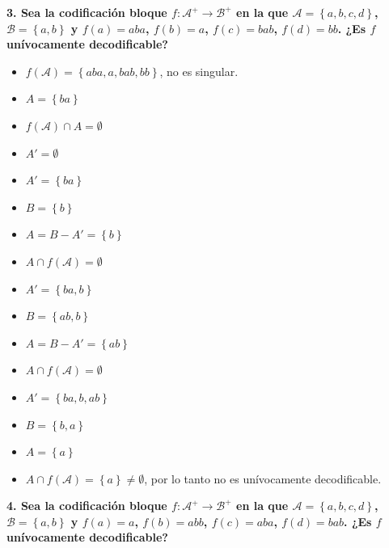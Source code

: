 \documentclass{article}
\begin{document}
\vspace{1cm}

\textbf{
3. Sea la codificación bloque $f:\mathcal{A}^+\rightarrow\mathcal{B}^+$ en la que $\mathcal{A}=\left\{a,b,c,d\right\}$, $\mathcal{B}=\left\{a,b\right\}$ y $f(a)=aba$, $f(b) = a$, $f(c)=bab$, $f(d)=bb$. ¿Es $f$ unívocamente decodificable?
}

\vspace{0.5cm}

\begin{itemize}
    \item $f\left(\mathcal{A}\right)=\left\{aba,a,bab,bb\right\}$, no es singular.
    \item $A = \left\{ba\right\}$
    \item $f\left(\mathcal{A}\right)\cap A = \emptyset$
    \item $A'=\emptyset$
    \item $A'=\left\{ba\right\}$
    \item $B = \left\{b\right\}$
    \item $A = B-A' = \left\{b\right\}$
    \item $A\cap f\left(\mathcal{A}\right) = \emptyset$
    \item $A'=\left\{ba,b\right\}$
    \item $B=\left\{ab, b\right\}$
    \item $A = B-A' = \left\{ab\right\}$
    \item $A\cap f\left(\mathcal{A}\right) = \emptyset$
    \item $A'=\left\{ba,b,ab\right\}$
    \item $B = \left\{b, a\right\}$
    \item $A = \left\{a\right\}$
    \item $A\cap f\left(\mathcal{A}\right) =\left\{a\right\}\neq \emptyset$, por lo tanto no es unívocamente decodificable.
\end{itemize}

\vspace{1cm}

\textbf{
4. Sea la codificación bloque $f:\mathcal{A}^+\rightarrow\mathcal{B}^+$ en la que $\mathcal{A}=\left\{a,b,c,d\right\}$, $\mathcal{B}=\left\{a,b\right\}$ y $f(a)=a$, $f(b) = abb$, $f(c)=aba$, $f(d)=bab$. ¿Es $f$ unívocamente decodificable?
}

\vspace{0.5cm}
\end{document}
